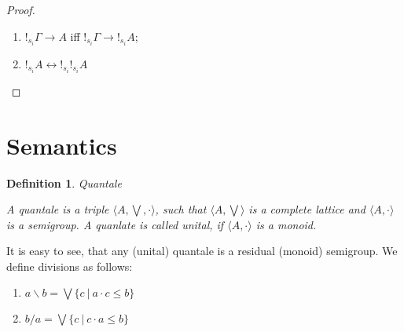 \documentclass[a4paper]{article}
\newtheorem{defin}{Definition}
\begin{document}
\begin{proof}
$ $

\begin{enumerate}
\item $!_{s_i} \Gamma \rightarrow A$ iff $!_{s_i} \Gamma \rightarrow !_{s_i} A$;
  \begin{prooftree}
  \end{prooftree}

\begin{prooftree}
\end{prooftree}

\item $!_{s_i} A \leftrightarrow !_{s_i} !_{s_i} A$

\begin{prooftree}
\end{prooftree}
\end{enumerate}
\end{proof}

\section{Semantics}

\begin{defin} Quantale
$ $

  A quantale is a triple $\langle A, \bigvee, \cdot \rangle$, such that $\langle A, \bigvee \rangle$
is a complete lattice and $\langle A, \cdot \rangle$ is a semigroup. A quanlate is called unital, if $\langle A, \cdot \rangle$
is a monoid.
\end{defin}

It is easy to see, that any (unital) quantale is a residual (monoid) semigroup. We define divisions as follows:

\begin{enumerate}
\item $a \backslash b = \bigvee \{ c \: | \: a \cdot c \leq b \}$
\item $b / a = \bigvee \{ c \: | \: c \cdot a \leq b \}$
\end{enumerate}
\end{document}
